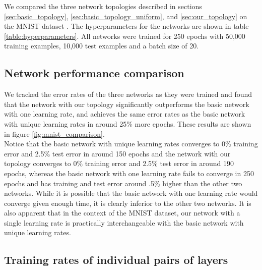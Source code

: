\documentclass{article}
\newcommand{\npar}{\\\indent}
\begin{document}
We compared the three network topologies described in sections \ref{sec:basic_topology}, \ref{sec:basic_topology_uniform}, and \ref{sec:our_topology} on the MNIST dataset \cite{mnist1998}. The hyperparameters for the networks are shown in table \ref{table:hyperparameters}. All networks were trained for 250 epochs with 50,000 training examples, 10,000 test examples and a batch size of 20.

\subsection{Network performance comparison}
\label{sec:network_performance}

We tracked the error rates of the three networks as they were trained and found that the network with our topology significantly outperforms the basic network with one learning rate, and achieves the same error rates as the basic network with unique learning rates in around 25\% more epochs. These results are shown in figure \ref{fig:mnist_comparison}.
\npar
 Notice that the basic network with unique learning rates converges to 0\% training error and 2.5\% test error in around 150 epochs and the network with our topology converges to 0\% training error and 2.5\% test error in around 190 epochs, whereas the basic network with one learning rate fails to converge in 250 epochs and has training and test error around .5\% higher than the other two networks. While it is possible that the basic network with one learning rate would converge given enough time, it is clearly inferior to the other two networks. It is also apparent that in the context of the MNIST dataset, our network with a single learning rate is practically interchangeable with the basic network with unique learning rates.

\subsection{Training rates of individual pairs of layers}
\label{sec:mnist_perlayer}
\end{document}
